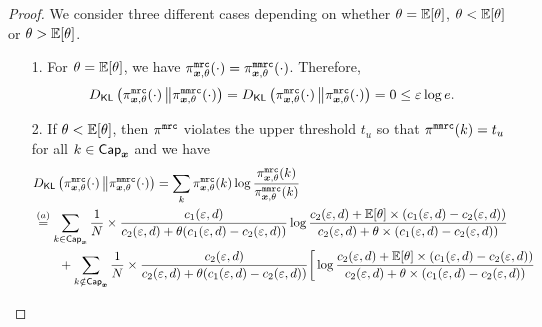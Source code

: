 \begin{proof}
We consider three different cases depending on whether $\theta = \mathbb{E}[\theta]$, $\theta < \mathbb{E}[\theta]$ or $\theta > \mathbb{E}[\theta]$.
\begin{enumerate}
    \item[1.]  For $\theta = \mathbb{E}[\theta]$, we have $\pi^{\texttt{mrc}}_{{\boldsymbol{x}}, \theta}(\cdot) = \pi^{\texttt{mmrc}}_{{\boldsymbol{x}}, \theta}(\cdot)$. Therefore,
    \begin{align}
    {D}_{\mathsf{KL}}\left( \pi^{\texttt{mrc}}_{{\boldsymbol{x}}, \theta}(\cdot)\, \middle\Vert \pi^{\texttt{mmrc}}_{{\boldsymbol{x}}, \theta}(\cdot) \right) = {D}_{\mathsf{KL}}\left( \pi^{\texttt{mrc}}_{{\boldsymbol{x}}, \theta}(\cdot)\, \middle\Vert \pi^{\texttt{mrc}}_{{\boldsymbol{x}}, \theta}(\cdot) \right) = 0 \leq \varepsilon \log e. \label{eq:KL_0}
    \end{align}
    \item[2.]
If $\theta < \mathbb{E}[\theta]$, then $\pi^{\texttt{mrc}}$ violates the upper threshold $t_u$ so that $\pi^{\texttt{mmrc}}(k) = t_u$ for all $k \in \mathsf{Cap}_{{\boldsymbol{x}}}$ and we have
\begin{align}
    & \KLD{\piMRC_{\svbx, \theta}(\cdot)}{\piMMRC_{\svbx, \theta}(\cdot)} = \sum_{k} \piMRC_{\svbx, \theta}(k) \log \dfrac{\piMRC_{\svbx, \theta}(k)}{\piMMRC_{\svbx, \theta}(k)} \\
    & \stackrel{(a)}{=} \sum_{k \in \msf{Cap}_{\svbx}} \frac{1}{N} \times \frac{ c_1(\varepsilon,d)}{c_2(\varepsilon,d) +  \theta (c_1(\varepsilon,d) - c_2(\varepsilon,d))} \log \dfrac{c_2(\varepsilon,d) + \Expectation[\theta] \times (c_1(\varepsilon,d) - c_2(\varepsilon,d))}{c_2(\varepsilon,d) +  \theta \times (c_1(\varepsilon,d) - c_2(\varepsilon,d))}\\ 
    &  \qquad  + \sum_{k \notin \msf{Cap}_{\svbx}} \frac{1}{N} \times \dfrac{c_2(\varepsilon,d)}{c_2(\varepsilon,d) +  \theta (c_1(\varepsilon,d) - c_2(\varepsilon,d))} \bigg[ \log \dfrac{c_2(\varepsilon,d)+ \Expectation[\theta] \times (c_1(\varepsilon,d) - c_2(\varepsilon,d))}{c_2(\varepsilon,d) +  \theta \times (c_1(\varepsilon,d) - c_2(\varepsilon,d))} \\

\end{align}
\end{enumerate}
\end{proof}

